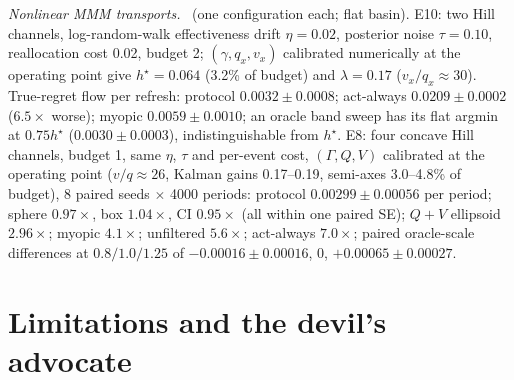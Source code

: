 \emph{Nonlinear MMM transports.} \tagNumerical\ (one configuration each; flat basin).  E10: two Hill channels, log-random-walk effectiveness drift $\eta = 0.02$, posterior noise $\tau = 0.10$, reallocation cost 0.02, budget 2; $(\gamma, q_x, v_x)$ calibrated numerically at the operating point give $h^\star = 0.064$ (3.2\% of budget) and $\lambda = 0.17$ ($v_x/q_x \approx 30$). True-regret flow per refresh: protocol $0.0032 \pm 0.0008$; act-always $0.0209 \pm 0.0002$ ($6.5\times$ worse); myopic $0.0059 \pm 0.0010$; an oracle band sweep has its flat argmin at $0.75h^\star$ ($0.0030 \pm 0.0003$), indistinguishable from $h^\star$.  E8: four concave Hill channels, budget 1, same $\eta$, $\tau$ and per-event cost, $(\Gamma, Q, V)$ calibrated at the operating point ($v/q \approx 26$, Kalman gains 0.17--0.19, semi-axes 3.0--4.8\% of budget), 8 paired seeds $\times$ 4000 periods: protocol $0.00299 \pm 0.00056$ per period; sphere $0.97\times$, box $1.04\times$, CI $0.95\times$ (all within one paired SE); $Q + V$ ellipsoid $2.96\times$; myopic $4.1\times$; unfiltered $5.6\times$; act-always $7.0\times$; paired oracle-scale differences at $0.8/1.0/1.25$ of $-0.00016 \pm 0.00016$, 0, $+0.00065 \pm 0.00027$.

\section{Limitations and the devil's advocate}
\label{deadband:sec:limits}

